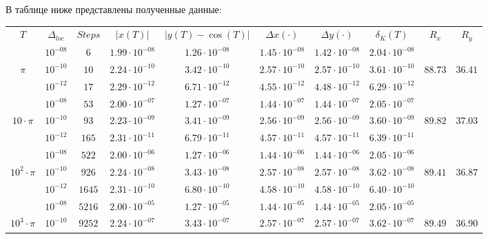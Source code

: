 \documentclass[a4paper,12pt]{article}
\begin{document}
В таблице ниже представлены полученные данные:

\begin{table}[H]
\begin{tabular}{|c|c|c|c|c|c|c|c|c|c|}
    \hline
    $T$&$\Delta_{loc}$&$Steps$&$|x(T)|$&$|y(T)-\cos(T)|$&$\Delta x(\cdot)$&$\Delta y(\cdot)$&$\delta_K(T)$&$R_x$&$R_y$\\
    \cline{1-10}
    &$ 10^{-08} $&$  6  $&$ 1.99\cdot 10^{-08} $&$ 1.26\cdot 10^{-08} $&$ 1.45\cdot 10^{-08} $&$ 1.42\cdot 10^{-08} $&$ 2.04\cdot 10^{-08} $&$ $& \\
    \cline{2-8}
    $\pi $&$ 10^{-10} $&$ 10 $&$ 2.24\cdot 10^{-10} $&$ 3.42\cdot 10^{-10} $&$ 2.57\cdot 10^{-10} $&$ 2.57\cdot 10^{-10} $&$ 3.61\cdot 10^{-10} $&$ 88.73 $&$ 36.41 $\\
    \cline{2-8}
    &$ 10^{-12} $&$ 17 $&$ 2.29\cdot 10^{-12} $&$ 6.71\cdot 10^{-12} $&$ 4.55\cdot 10^{-12} $&$ 4.48\cdot 10^{-12} $&$ 6.29\cdot 10^{-12} $&$ $& \\
    \cline{1-10}
    &$ 10^{-08} $&$ 53 $&$ 2.00\cdot 10^{-07} $&$ 1.27\cdot 10^{-07} $&$ 1.44\cdot 10^{-07} $&$ 1.44\cdot 10^{-07} $&$ 2.05\cdot 10^{-07} $&$ $&\\
    \cline{2-8}
    $10\cdot \pi $&$ 10^{-10} $&$ 93 $&$ 2.23\cdot 10^{-09} $&$ 3.41\cdot 10^{-09} $&$ 2.56\cdot 10^{-09} $&$ 2.56\cdot 10^{-09} $&$ 3.60\cdot 10^{-09} $&$89.82$&$37.03$\\
    \cline{2-8}
    &$ 10^{-12} $&$ 165 $&$ 2.31\cdot 10^{-11} $&$ 6.79\cdot 10^{-11} $&$ 4.57\cdot 10^{-11} $&$ 4.57\cdot 10^{-11} $&$ 6.39\cdot 10^{-11} $&$ $&\\
    \cline{1-10}
    &$10^{-08}$&$ 522$&$ 2.00\cdot 10^{-06}$&$  1.27\cdot 10^{-06}$&$  1.44\cdot 10^{-06}$&$  1.44\cdot 10^{-06}$&$  2.05\cdot 10^{-06}$&&\\
    \cline{2-8}
    $10^2 \cdot \pi$&$10^{-10}$&$ 926$&$ 2.24\cdot 10^{-08}$&$  3.43\cdot 10^{-08}$&$  2.57\cdot 10^{-08}$&$  2.57\cdot 10^{-08}$&$  3.62\cdot 10^{-08}$&$89.41$&$36.87$\\ 
    \cline{2-8}
    &$10^{-12}$&$ 1645$&$ 2.31\cdot 10^{-10}$&$  6.80\cdot 10^{-10}$&$  4.58\cdot 10^{-10}$&$  4.58\cdot 10^{-10}$&$  6.40\cdot 10^{-10}$&&\\
    \cline{1-10}
    &$10^{-08}$&$ 5216$&$  2.00\cdot 10^{-05}$&$  1.27\cdot 10^{-05}$&$  1.44\cdot 10^{-05}$&$  1.44\cdot 10^{-05}$&$  2.05\cdot 10^{-05}$& &\\
    \cline{2-8}
    $10^3 \cdot \pi$&$10^{-10}$&$ 9252$&$  2.24\cdot 10^{-07}$&$  3.43\cdot 10^{-07}$&$  2.57\cdot 10^{-07}$&$  2.57\cdot 10^{-07}$&$  3.62\cdot 10^{-07}$&$89.49$&$36.90$\\ 

\end{tabular}
\end{table}
\end{document}
